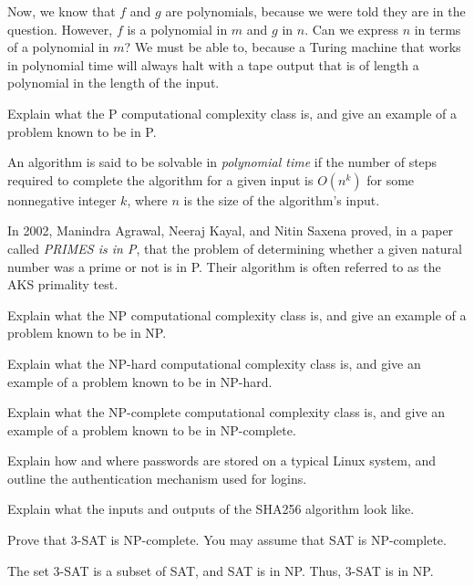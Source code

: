 \documentclass[a4paper, 12pt]{exam}
\begin{document}
\begin{questions}
\begin{solution}
    Now, we know that \( f \) and \( g \) are polynomials, because we were told they are in the question.
    However, \( f \) is a polynomial in \( m \) and \( g \) in \( n \).
    Can we express \( n \) in terms of a polynomial in \( m \)?
    We must be able to, because a Turing machine that works in polynomial time will always halt with a tape output that is of length a polynomial in the length of the input. 
  \end{solution}


\question
  Explain what the P computational complexity class is, and give an example of a problem known to be in P.
  \begin{solution}
    An algorithm is said to be solvable in \emph{polynomial time} if the number of steps required to complete the algorithm for a given input is \( O(n^k) \) for some nonnegative integer \( k \), where \( n \) is the size of the algorithm's input.

    In 2002, Manindra Agrawal, Neeraj Kayal, and Nitin Saxena proved, in a paper called \emph{PRIMES is in P}, that the problem of determining whether a given natural number was a prime or not is in P.
    Their algorithm is often referred to as the AKS primality test.
  \end{solution}


\question
  Explain what the NP computational complexity class is, and give an example of a problem known to be in NP.


\question
  Explain what the NP-hard computational complexity class is, and give an example of a problem known to be in NP-hard.


\question
  Explain what the NP-complete computational complexity class is, and give an example of a problem known to be in NP-complete.


\question
  Explain how and where passwords are stored on a typical Linux system, and outline the authentication mechanism used for logins.


\question
  Explain what the inputs and outputs of the SHA256 algorithm look like.


\question
  Prove that 3-SAT is NP-complete. You may assume that SAT is NP-complete.
  \begin{solution}
    The set 3-SAT is a subset of SAT, and SAT is in NP.
    Thus, 3-SAT is in NP.


\end{solution}
\end{questions}
\end{document}
